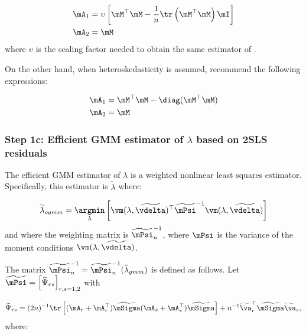 \documentclass[english,12pt]{book}\usepackage[]{graphicx}\usepackage[]{xcolor}
\begin{document}
\begin{equation*}
  \begin{aligned}
    \mA_1 & = \upsilon \left[\mM^\top\mM - \frac{1}{n}\tr\left(\mM^\top\mM\right)\mI\right]\\ 
    \mA_2 & = \mM
  \end{aligned}
\end{equation*}
%
where $\upsilon$ is the scaling factor needed to obtain the same estimator of \cite{kelejian1998generalized, kelejian1999generalized}. 

On the other hand, when heteroskedasticity is assumed, \cite{kelejian2010specification} recommend the following expressions:


\begin{equation*}
\begin{aligned}
\mA_1 & = \mM^\top\mM  - \diag(\mM^\top\mM) \\
\mA_2 & = \mM
\end{aligned}
\end{equation*}



\subsubsection{Step 1c: Efficient GMM estimator of $\lambda$ based on 2SLS residuals}

The efficient GMM estimator of $\lambda$ is a weighted nonlinear least squares estimator. Specifically, this estimator is $\widetilde{\lambda}$ where:

\begin{equation}\label{eq:nonlinear-gmm-lambda}
\widetilde{\lambda}_{ogmm} = \underset{\lambda}{\argmin} \left[\vm(\lambda,\widetilde{\vdelta})^\top\widetilde{\mPsi}^{-1}\vm(\lambda,\widetilde{\vdelta}) \right]
\end{equation}
%
and where the weighting matrix is $\widetilde{\mPsi}^{-1}_n$, where $\mPsi$ is the variance of the moment conditions $\vm(\lambda,\widetilde{\vdelta})$. 


The matrix $\widetilde{\mPsi}^{-1}_n= \widetilde{\mPsi}^{-1}_n (\breve{\lambda}_{gmm})$ is defined as follows. Let $\widetilde{\mPsi} = \left[\widehat{\Psi}_{rs}\right]_{r,s = 1, 2}$ with

\begin{equation}
\widetilde{\Psi}_{rs} = (2n)^{-1}\tr\left[(\mA_r + \mA_r^\top)\widetilde{\mSigma}(\mA_s + \mA_s^\top)\widetilde{\mSigma}\right] + n^{-1}\widetilde{\va}_r^\top\widetilde{\mSigma}\widetilde{\va}_s,
\end{equation}
%
where:
\end{document}
